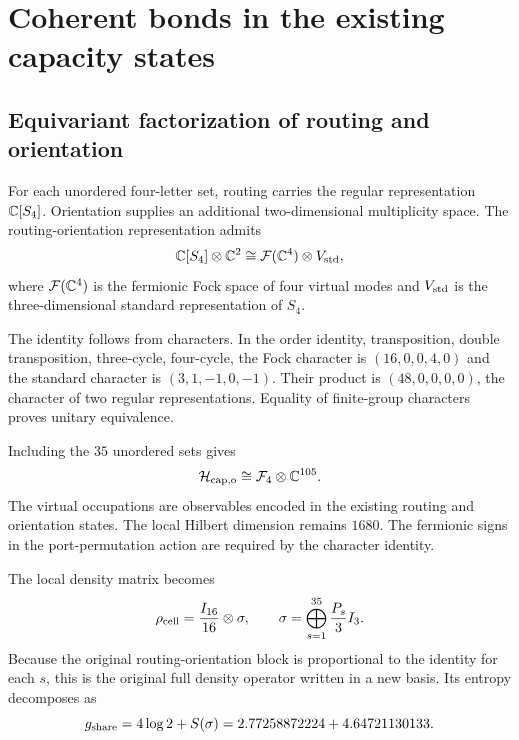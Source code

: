 \section{Coherent bonds in the existing capacity states}
\label{sec:bonds}

\subsection{Equivariant factorization of routing and orientation}

For each unordered four-letter set, routing carries the regular representation $\mathbb C[S_4]$. Orientation supplies an additional two-dimensional multiplicity space. The routing-orientation representation admits
\begin{equation}
\mathbb C[S_4]\otimes\mathbb C^2
\cong\mathcal F(\mathbb C^4)\otimes V_{\rm std},
\label{eq:fockidentity}
\end{equation}
where $\mathcal F(\mathbb C^4)$ is the fermionic Fock space of four virtual modes and $V_{\rm std}$ is the three-dimensional standard representation of $S_4$.

The identity follows from characters. In the order identity, transposition, double transposition, three-cycle, four-cycle, the Fock character is $(16,0,0,4,0)$ and the standard character is $(3,1,-1,0,-1)$. Their product is $(48,0,0,0,0)$, the character of two regular representations. Equality of finite-group characters proves unitary equivalence.

Including the $35$ unordered sets gives
\begin{equation}
\mathcal H_{\rm cap,o}\cong\mathcal F_4\otimes\mathbb C^{105}.
\end{equation}
The virtual occupations are observables encoded in the existing routing and orientation states. The local Hilbert dimension remains $1680$. The fermionic signs in the port-permutation action are required by the character identity.

The local density matrix becomes
\begin{equation}
\rho_{\rm cell}=\frac{I_{16}}{16}\otimes\sigma,\qquad
\sigma=\bigoplus_{s=1}^{35}\frac{P_s}{3}I_3.
\label{eq:localfactor}
\end{equation}
Because the original routing-orientation block is proportional to the identity for each $s$, this is the original full density operator written in a new basis. Its entropy decomposes as
\begin{equation}
g_{\rm share}=4\log2+S(\sigma)
=2.77258872224+4.64721130133.
\end{equation}

